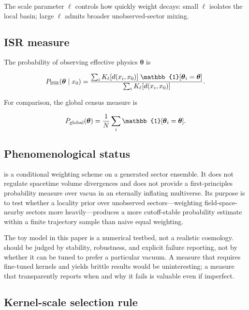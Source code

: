 The scale parameter $\ell$ controls how quickly weight decays:
small $\ell$ isolates the local basin; large $\ell$ admits broader
unobserved-sector mixing.

\subsection{ISR measure}

The \ISR probability of observing effective physics $\boldsymbol{\theta}$ is

\begin{equation}
\label{eq:isr_measure}
P_{\rm ISR}(\boldsymbol{\theta} \mid x_0)
= \frac{\sum_i K_\ell[d(x_i,x_0)] \; \mathbb{1}[\boldsymbol{\theta}_i = \boldsymbol{\theta}]}
        {\sum_i K_\ell[d(x_i,x_0)]}.
\end{equation}

For comparison, the global census measure is

\begin{equation}
\label{eq:global_measure}
P_{\rm global}(\boldsymbol{\theta})
= \frac{1}{N} \sum_i \mathbb{1}[\boldsymbol{\theta}_i = \boldsymbol{\theta}].
\end{equation}

\subsection{Phenomenological status}
\label{sec:phenomenological_status}

\ISR is a conditional weighting scheme on a generated sector ensemble.
It does not regulate spacetime volume divergences and does not provide a
first-principles probability measure over vacua in an eternally inflating
multiverse.
Its purpose is to test whether a locality prior over unobserved
sectors---weighting field-space-nearby sectors more heavily---produces a
more cutoff-stable probability estimate within a finite trajectory sample
than naive equal weighting.

The toy model in this paper is a numerical testbed, not a realistic cosmology.
\ISR should be judged by stability, robustness, and explicit failure reporting,
not by whether it can be tuned to prefer a particular vacuum.
A measure that requires fine-tuned kernels and yields brittle results would be
uninteresting; a measure that transparently reports when and why it fails is
valuable even if imperfect.

\subsection{Kernel-scale selection rule}
\label{sec:kernel_scale_rule}

